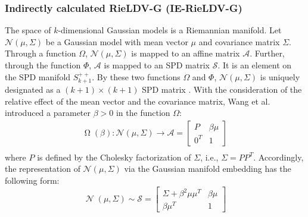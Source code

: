 \documentclass[review]{elsarticle}
\begin{document}
\subsubsection{Indirectly calculated RieLDV-G (IE-RieLDV-G)}
	\indent The space of $k$-dimensional Gaussian models is a Riemannian manifold. Let  $\mathcal{N}(\mu,\Sigma)$ be a Gaussian model with mean vector $\mu$ and covariance matrix $\Sigma$. Through a function $\Omega$, $\mathcal{N}(\mu,\Sigma)$ is mapped to an affine matrix  $\mathcal{A}$. Further, through the function $\Phi$, $\mathcal{A}$ is mapped to an SPD matrix $\mathcal{S}$. It is an element on the SPD manifold $S_{k+1}^{++}$. By these two functions $\Omega$ and $\Phi$, $\mathcal{N}(\mu,\Sigma)$ is uniquely designated as a $(k+1)\times(k+1)$ SPD matrix \cite{lovric2000multivariate}. With the consideration of the relative effect of the mean vector and the covariance matrix, Wang et al.\cite{wang2016towards} introduced a parameter $\beta > 0$ in the function $\Omega$:
\begin{equation}
\label{aff_Group}
\begin{split}
\mathop \Omega(\beta): \mathcal{N}(\mu,\Sigma) \to \mathcal{A} =  \left[  \begin{array}{cc}
      P &\beta\mu \\
      0^T & 1
    \end{array} \right] \\
\end{split}
\end{equation}
where $P$ is defined by the Cholesky factorization of $\Sigma$, i.e., $\Sigma = PP^T$. Accordingly, the representation of $\mathcal{N}(\mu,\Sigma)$ via the Gaussian manifold embedding \cite{wang2016towards} has the following form:
\begin{equation}
\label{Gauss_Embedding}
\mathop \mathcal{N}(\mu,\Sigma) \sim \mathcal{S} = \left[  \begin{array}{cc}
      \Sigma + {\beta}^2{\mu}{\mu}^T & \beta\mu \\
      \beta{\mu}^T & 1
    \end{array} \right]
\end{equation}
\end{document}
